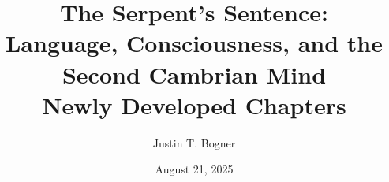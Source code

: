 \documentclass[12pt]{book}
\begin{document}
\title{The Serpent's Sentence:\\Language, Consciousness, and the Second Cambrian Mind\\[1em]{\large Newly Developed Chapters}}
\author{Justin T. Bogner}
\date{August 21, 2025}

\frontmatter
\maketitle

\tableofcontents

\mainmatter

\setcounter{chapter}{6}





\setcounter{chapter}{9}


\setcounter{chapter}{10}


\backmatter
\printbibliography
\end{document}
